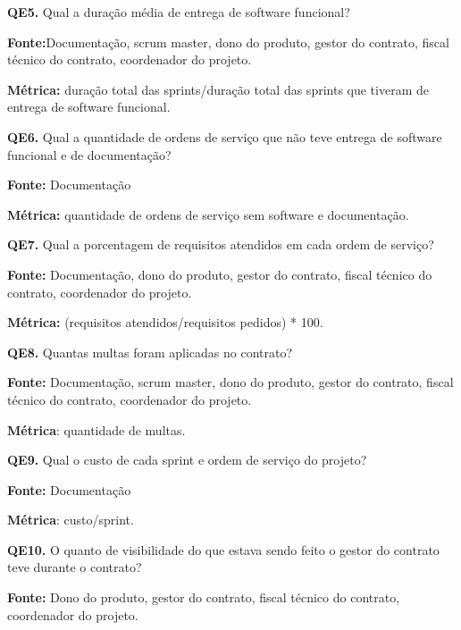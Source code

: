 \textbf{QE5.} Qual a duração média de entrega de software funcional?

\textbf{Fonte:}Documentação, scrum master, dono do produto, gestor do contrato, fiscal técnico do contrato, coordenador do projeto.

\textbf{Métrica:} duração total das sprints/duração total das sprints que tiveram de entrega de software funcional.

 \vspace{\onelineskip} 

\textbf{QE6.} Qual a quantidade de ordens de serviço que não teve entrega de software funcional e de documentação?

\textbf{Fonte:} Documentação

\textbf{Métrica:} quantidade de ordens de serviço sem software e documentação.

 \vspace{\onelineskip} 
 
\textbf{QE7.} Qual a porcentagem de requisitos atendidos em cada ordem de serviço?

\textbf{Fonte:} Documentação, dono do produto, gestor do contrato, fiscal técnico do contrato, coordenador do projeto.

\textbf{Métrica:} (requisitos atendidos/requisitos pedidos) * 100.
 
 \vspace{\onelineskip} 

\textbf{QE8.} Quantas multas foram aplicadas no contrato?

\textbf{Fonte:} Documentação, scrum master, dono do produto, gestor do contrato, fiscal técnico do contrato, coordenador do projeto.

\textbf{Métrica}: quantidade de multas.

 \vspace{\onelineskip}  

\textbf{QE9.} Qual o custo de cada sprint e ordem de serviço do projeto?

\textbf{Fonte:} Documentação

\textbf{Métrica}: custo/sprint.

 \vspace{\onelineskip}  

\textbf{QE10.} O quanto de visibilidade do que estava sendo feito o gestor do contrato teve durante o contrato?

\textbf{Fonte:} Dono do produto, gestor do contrato, fiscal técnico do contrato, coordenador do projeto.

